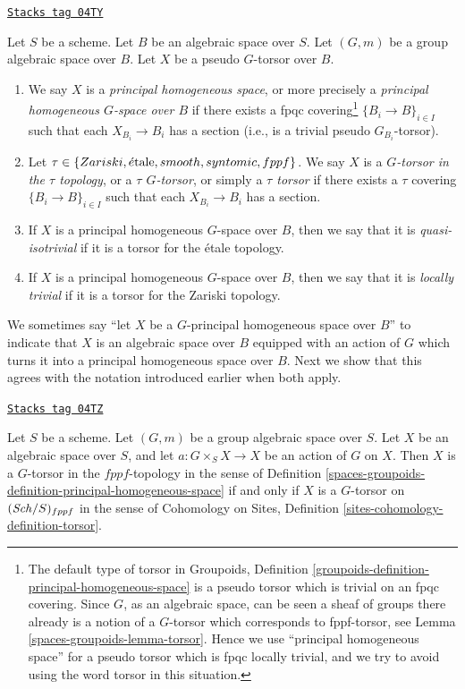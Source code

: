 \begin{definition}
\label{spaces-groupoids-definition-principal-homogeneous-space}
\href{https://stacks.math.columbia.edu/tag/04TY}{\texttt{Stacks tag 04TY}}

Let $S$ be a scheme.
Let $B$ be an algebraic space over $S$.
Let $(G, m)$ be a group algebraic space over $B$.
Let $X$ be a pseudo $G$-torsor over $B$.
\begin{enumerate}
\item We say $X$ is a
{\it principal homogeneous space}, or more precisely a
{\it principal homogeneous $G$-space over $B$}
if there exists a fpqc covering\footnote{The default type of torsor in
Groupoids, Definition \ref{groupoids-definition-principal-homogeneous-space}
is a pseudo torsor which is trivial on an fpqc covering.
Since $G$, as an algebraic space, can be seen a sheaf of groups
there already is a notion of a $G$-torsor which corresponds
to fppf-torsor, see
Lemma \ref{spaces-groupoids-lemma-torsor}.
Hence we use ``principal homogeneous space'' for a pseudo torsor which
is fpqc locally trivial, and we try to avoid using the word torsor in
this situation.}
$\{B_i \to B\}_{i \in I}$ such that each
$X_{B_i} \to B_i$ has a section (i.e., is a trivial pseudo $G_{B_i}$-torsor).
\item Let $\tau \in \{Zariski, \acute{e}\text{tale}, smooth, syntomic, fppf\}$.
We say $X$ is a {\it $G$-torsor in the $\tau$ topology}, or a
{\it $\tau$ $G$-torsor}, or simply a {\it $\tau$ torsor}
if there exists a $\tau$ covering $\{B_i \to B\}_{i \in I}$
such that each $X_{B_i} \to B_i$ has a section.
\item If $X$ is a principal homogeneous $G$-space over $B$,
then we say that it is
{\it quasi-isotrivial} if it is a torsor for the \'etale topology.
\item If $X$ is a principal homogeneous $G$-space over $B$,
then we say that it is
{\it locally trivial} if it is a torsor for the Zariski topology.
\end{enumerate}
\end{definition}

We sometimes say ``let $X$ be a $G$-principal homogeneous space over $B$''
to indicate that $X$ is an algebraic space over $B$ equipped with an
action of $G$ which turns it into a principal homogeneous space over $B$.
Next we show that this agrees with the notation introduced earlier
when both apply.

\begin{lemma}[Torsor]
\label{spaces-groupoids-lemma-torsor}
\href{https://stacks.math.columbia.edu/tag/04TZ}{\texttt{Stacks tag 04TZ}}

Let $S$ be a scheme.
Let $(G, m)$ be a group algebraic space over $S$.
Let $X$ be an algebraic space over $S$, and let
$a : G \times_S X \to X$ be an action of $G$ on $X$.
Then
$X$ is a $G$-torsor in the $fppf$-topology in the sense of
Definition \ref{spaces-groupoids-definition-principal-homogeneous-space}
if and only if
$X$ is a $G$-torsor on $(\mathit{Sch}/S)_{fppf}$
in the sense of
Cohomology on Sites, Definition \ref{sites-cohomology-definition-torsor}.
\end{lemma}

